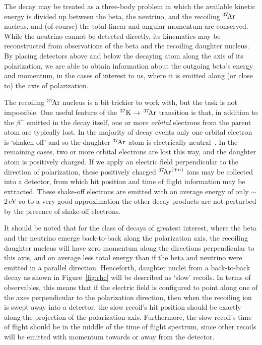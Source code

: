 
The decay may be treated as a three-body problem in which the available kinetic energy is divided up between the beta, the neutrino, and the recoiling $^{37}\textrm{\!Ar}$ nucleus, and (of course) the total linear and angular momentum are conserved.  While the neutrino cannot be detected directly, its kinematics may be reconstructed from observations of the beta and the recoiling daughter nucleus.  By placing detectors above and below the decaying atom along the axis of its polarization, we are able to obtain information about the outgoing beta's energy and momentum, in the cases of interest to us, where it is emitted along (or close to) the axis of polarization.  

The recoiling $^{37}\textrm{\!Ar}$ nucleus is a bit trickier to work with, but the task is not impossible.  One useful feature of the $^{37}\textrm{K} \rightarrow \,^{37}\textrm{\!Ar}$ transition is that, in addition to the $\beta^+$ emitted in the decay itself, one or more \emph{orbital} electrons from the parent atom are typically lost.  In the majority of decay events
only one orbital electron is `shaken off' and so the daughter $^{37}\textrm{\!Ar}$ atom is electrically neutral~\cite{Gorelov2000}\cite{dan_thesis}.  In the remaining cases, two or more orbital electrons are lost this way, and the daughter atom is positively charged.  If we apply an electric field perpendicular to the direction of polarization, these positively charged $^{37}\textrm{\!Ar}^{(+n)}$ ions may be collected into a detector, from which hit position and time of flight information may be extracted.  These shake-off electrons are emitted with an average energy of only $\sim$ 2\,eV
so to a very good approximation the other decay products are not perturbed by the presence of shake-off electrons.  

It should be noted that for the class of decays of greatest interest, where the beta and the neutrino emerge back-to-back along the polarization axis, the recoiling daughter nucleus will have zero momentum along the directions perpendicular to this axis, and on average less total energy than if the beta and neutrino were emitted in a parallel direction.  Henceforth, daughter nuclei from a back-to-back decay as shown in Figure~\ref{fig:rhc} will be described as `slow' recoils.  In terms of observables, this means that if the electric field is configured to point along one of the axes perpendicular to the polarization direction, then when the recoiling ion is swept away into a detector, the slow recoil's hit position should be exactly along the projection of the polarization axis.  Furthermore, the slow recoil's time of flight should be in the middle of the time of flight spectrum, since other recoils will be emitted with momentum towards or away from the detector.  

